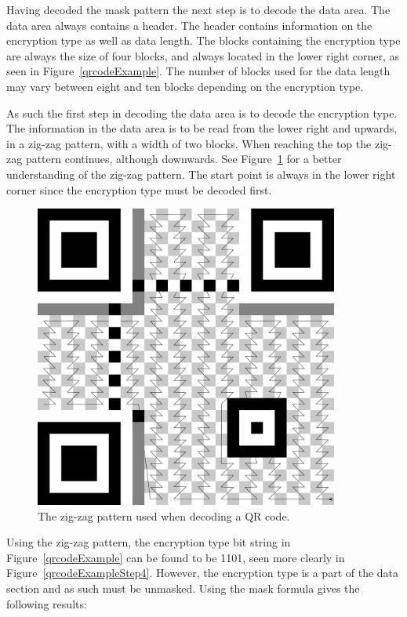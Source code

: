 Having decoded the mask pattern the next step is to decode the data area. The data area always contains a header. The header contains information on the encryption type as well as data length. The blocks containing the encryption type are always the size of four blocks, and always located in the lower right corner, as seen in Figure~\ref{qrcodeExample}. The number of blocks used for the data length may vary between eight and ten blocks depending on the encryption type.

As such the first step in decoding the data area is to decode the encryption type. The information in the data area is to be read from the lower right and upwards, in a zig-zag pattern, with a width of two blocks. When reaching the top the zig-zag pattern continues, although downwards. See Figure~\ref{qrcodezigzag} for a better understanding of the zig-zag pattern. The start point is always in the lower right corner since the encryption type must be decoded first.

	\begin{figure}[H]%
		\centering
		\includegraphics[width=100mm]{images/qrcodezigzag}
		\caption{The zig-zag pattern used when decoding a QR code.}
		\label{qrcodezigzag}
	\end{figure}

Using the zig-zag pattern, the encryption type bit string in Figure~\ref{qrcodeExample} can be found to be 1101, seen more clearly in Figure~\ref{qrcodeExampleStep4}. However, the encryption type is a part of the data section and as such must be unmasked. Using the mask formula gives the following results:

